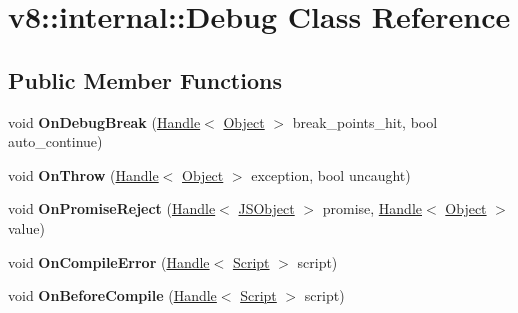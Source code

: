 \hypertarget{classv8_1_1internal_1_1_debug}{}\section{v8\+:\+:internal\+:\+:Debug Class Reference}
\label{classv8_1_1internal_1_1_debug}
\subsection*{Public Member Functions}
\begin{DoxyCompactItemize}
\item 
\hypertarget{classv8_1_1internal_1_1_debug_a9ce419d2374da2fe084aa95de446e941}{}void {\bfseries On\+Debug\+Break} (\hyperlink{classv8_1_1internal_1_1_handle}{Handle}$<$ \hyperlink{classv8_1_1internal_1_1_object}{Object} $>$ break\+\_\+points\+\_\+hit, bool auto\+\_\+continue)\label{classv8_1_1internal_1_1_debug_a9ce419d2374da2fe084aa95de446e941}

\item 
\hypertarget{classv8_1_1internal_1_1_debug_a1c0731e78d9e4ef58b2e65cddee14ea5}{}void {\bfseries On\+Throw} (\hyperlink{classv8_1_1internal_1_1_handle}{Handle}$<$ \hyperlink{classv8_1_1internal_1_1_object}{Object} $>$ exception, bool uncaught)\label{classv8_1_1internal_1_1_debug_a1c0731e78d9e4ef58b2e65cddee14ea5}

\item 
\hypertarget{classv8_1_1internal_1_1_debug_ac82385427ea17ba4d1e910a57cf1a7c8}{}void {\bfseries On\+Promise\+Reject} (\hyperlink{classv8_1_1internal_1_1_handle}{Handle}$<$ \hyperlink{classv8_1_1internal_1_1_j_s_object}{J\+S\+Object} $>$ promise, \hyperlink{classv8_1_1internal_1_1_handle}{Handle}$<$ \hyperlink{classv8_1_1internal_1_1_object}{Object} $>$ value)\label{classv8_1_1internal_1_1_debug_ac82385427ea17ba4d1e910a57cf1a7c8}

\item 
\hypertarget{classv8_1_1internal_1_1_debug_a9ac90b1fd7b555a797c838f97e083ea6}{}void {\bfseries On\+Compile\+Error} (\hyperlink{classv8_1_1internal_1_1_handle}{Handle}$<$ \hyperlink{classv8_1_1internal_1_1_script}{Script} $>$ script)\label{classv8_1_1internal_1_1_debug_a9ac90b1fd7b555a797c838f97e083ea6}

\item 
\hypertarget{classv8_1_1internal_1_1_debug_abecd206e99e0880cee0053a839deaf3e}{}void {\bfseries On\+Before\+Compile} (\hyperlink{classv8_1_1internal_1_1_handle}{Handle}$<$ \hyperlink{classv8_1_1internal_1_1_script}{Script} $>$ script)\label{classv8_1_1internal_1_1_debug_abecd206e99e0880cee0053a839deaf3e}


\end{DoxyCompactItemize}
